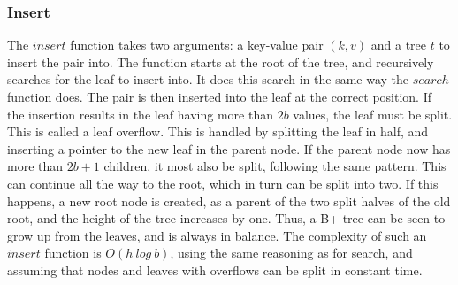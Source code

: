 \subsubsection{Insert}
The $insert$ function takes two arguments: a key-value pair $(k, v)$ and a tree $t$ to insert the pair into. The function starts at the root of the tree, and recursively searches for the leaf to insert into. It does this search in the same way the $search$ function does. The pair is then inserted into the leaf at the correct position. If the insertion results in the leaf having more than $2b$ values, the leaf must be split. This is called a leaf overflow. This is handled by splitting the leaf in half, and inserting a pointer to the new leaf in the parent node. If the parent node now has more than $2b+1$ children, it most also be split, following the same pattern. This can continue all the way to the root, which in turn can be split into two. If this happens, a new root node is created, as a parent of the two split halves of the old root, and the height of the tree increases by one. Thus, a B+ tree can be seen to grow up from the leaves, and is always in balance. The complexity of such an $insert$ function is $O(h~log~b)$, using the same reasoning as for search, and assuming that nodes and leaves with overflows can be split in constant time.
